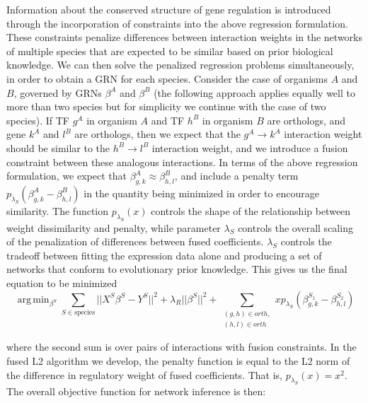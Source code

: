 \documentclass[11pt]{article}
\DeclareMathOperator*{\argmin}{arg\,min}
\begin{document}
Information about the conserved structure of gene regulation is introduced through the incorporation of constraints into the above regression formulation. These constraints penalize differences between interaction weights in the networks of multiple species that are expected to be similar based on prior biological knowledge. We can then solve the penalized regression problems simultaneously, in order to obtain a GRN for each species. Consider the case of organisms $A$ and $B$, governed by GRNs $\beta^A$ and $\beta^B$ (the following approach applies equally well to more than two species but for simplicity we continue with the case of two species). If TF $g^A$ in organism $A$ and TF $h^B$ in organism $B$ are orthologs, and gene $k^A$ and $l^B$ are orthologs, then we expect that the $g^A \rightarrow k^A$ interaction weight should be similar to the $h^B \rightarrow l^B$ interaction weight, and we introduce a fusion constraint between these analogous interactions. In terms of the above regression formulation, we expect that $\beta^A_{g,k} \approx \beta^B_{h,l}$, and include a penalty term $p_{\lambda_S}(\beta^A_{g,k} - \beta^B_{h,l})$ in the quantity being minimized in order to encourage similarity. The function $p_{\lambda_S}(x)$ controls the shape of the relationship between weight dissimilarity and penalty, while parameter $\lambda_S$ controls the overall scaling of the penalization of differences between fused coefficients. $\lambda_S$ controls the tradeoff between fitting the expression data alone and producing a set of networks that conform to evolutionary prior knowledge. This gives us the final equation to be minimized 
\begin{equation}
\argmin_{\beta^S} \displaystyle\sum_{S \in \text{species}} \vert \vert X^S\beta^S - Y^S \vert \vert ^2 + \lambda_R \vert \vert \beta^S \vert \vert ^2 + \displaystyle \sum_{\substack{(g,h) \in orth,\\
 (h,l) \in orth}}x p_{\lambda_S}(\beta^{S_1}_{g,k} - \beta^{S_2}_{h,l})
\end{equation}

where the second sum is over pairs of interactions with fusion constraints. In the fused L2 algorithm we develop, the penalty function is equal to the L2 norm of the difference in regulatory weight of fused coefficients. That is, $p_{\lambda_S}(x)=x^2$. The overall objective function for network inference is then:
\end{document}

